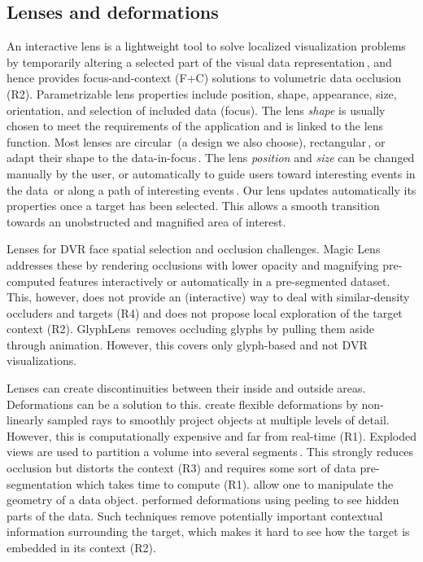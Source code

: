 \subsection{Lenses and deformations}
%
An interactive lens is a lightweight tool to solve localized visualization problems by temporarily altering a selected part of the visual data representation\,\cite{CGF:CGF12871}, and hence provides focus-and-context (F+C) solutions to volumetric data occlusion (R2). Parametrizable lens properties include position, shape, appearance, size, orientation, and selection of included data (focus). The lens \emph{shape} is usually chosen to meet the requirements of the application and is linked to the lens function. Most lenses are circular\,\cite{1648236} (a design we also choose), rectangular\,\cite{Kincaid:2010:SFA:1907651.1907963}, or adapt their shape to the data-in-focus\,\cite{Pindat:2012:JCA:2380116.2380150,Thiede2008}. The lens \emph{position} and \emph{size} can be changed manually by the user, or automatically to guide users toward interesting events in the data\,\cite{Tominski:2011:ECU:2336207.2336211} or along a path of interesting events\,\cite{Alvina:2014:RER:2598153.2598200}. Our lens updates automatically its properties once a target has been selected. This allows a smooth transition towards an unobstructed and magnified area of interest.

Lenses for DVR face spatial selection and occlusion challenges. Magic Lens\,\cite{1532818} addresses these by rendering occlusions with lower opacity and magnifying pre-computed features interactively or automatically in a pre-segmented dataset. This, however, does not provide an (interactive) way to deal with similar-density occluders and targets (R4) and does not propose local exploration of the target context (R2). GlyphLens\,\cite{7539643} removes occluding glyphs by pulling them aside through animation. However, this covers only glyph-based and not DVR visualizations. 

Lenses can create discontinuities between their inside and outside areas. Deformations can be a solution to this.
 \cite{Hsu:2011:RFM:2070781.2024165} create flexible deformations by non-linearly sampled rays to smoothly project objects at multiple levels of detail. However, this is computationally expensive and far from real-time (R1). Exploded views are used to partition a volume into several segments\,\cite{Sonnet:2004:IEA:989863.989871,4015467}. This strongly reduces occlusion but distorts the context (R3) and requires some sort of data pre-segmentation which takes time to compute (R1). \cite{Correa:2007:IDD:1313046.1313163,Correa:2006:FAV:1187627.1187827} allow one to manipulate the geometry of a data object.\cite{1250400} performed deformations using peeling to see hidden parts of the data. Such techniques remove potentially important contextual information surrounding the target, which makes it hard to see how the target is embedded in its context (R2).

